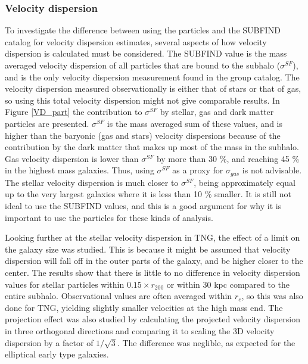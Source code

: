 \subsubsection{Velocity dispersion}
To investigate the difference between using the particles and the SUBFIND catalog for velocity dispersion estimates, several aspects of how velocity dispersion is calculated must be considered. The SUBFIND value is the mass averaged velocity dispersion of all particles that are bound to the subhalo ($\sigma^{SF}$), and is the only velocity dispersion measurement found in the group catalog. The velocity dispersion measured observationally is either that of stars or that of gas, so using this total velocity dispersion might not give comparable results. In Figure \ref{VD_part} the contribution to $\sigma^{SF}$ by stellar, gas and dark matter particles are presented. $\sigma^{SF}$ is the mass averaged sum of these values, and is higher than the baryonic (gas and stars) velocity dispersions because of the contribution by the dark matter that makes up most of the mass in the subhalo. Gas velocity dispersion is lower than $\sigma^{SF}$ by more than 30 \%, and reaching 45 \% in the highest mass galaxies. Thus, using $\sigma^{SF}$ as a proxy for $\sigma_{gas}$ is not advisable. The stellar velocity dispersion is much closer to $\sigma^{SF}$, being approximately equal up to the very largest galaxies where it is less than 10 \% smaller. It is still not ideal to use the SUBFIND values, and this is a good argument for why it is important to use the particles for these kinds of analysis.

Looking further at the stellar velocity dispersion in TNG, the effect of a limit on the galaxy size was studied. This is because it might be assumed that velocity dispersion will fall off in the outer parts of the galaxy, and be higher closer to the center. The results show that there is little to no difference in velocity dispersion values for stellar particles within $0.15 \times r_{200}$ or within 30 kpc compared to the entire subhalo. Observational values are often averaged within $r_e$, so this was also done for TNG, yielding slightly smaller velocities at the high mass end. The projection effect was also studied by calculating the projected velocity dispersion in three orthogonal directions and comparing it to scaling the 3D velocity dispersion by a factor of $1/\sqrt{3}$. The difference was neglible, as expected for the elliptical early type galaxies.


